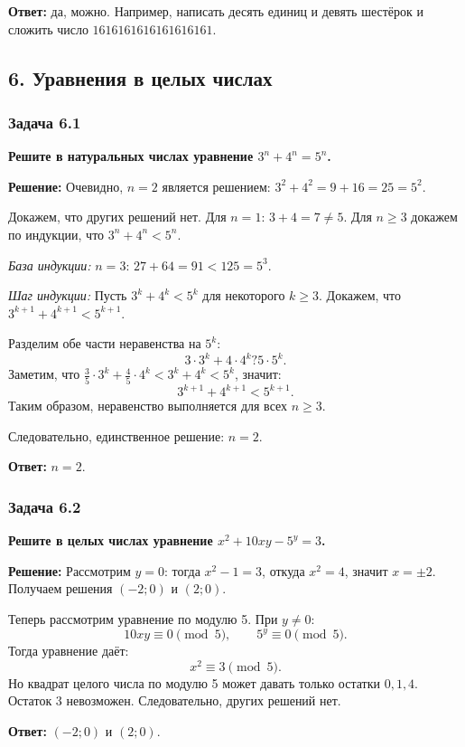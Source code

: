 \documentclass[12pt, a4paper]{article}
\begin{document}
\textbf{Ответ:} да, можно. Например, написать десять единиц и девять шестёрок и сложить число $1616161616161616161$.

\subsection*{6. Уравнения в целых числах}

\subsubsection*{Задача 6.1}
\textbf{Решите в натуральных числах уравнение $3^n + 4^n = 5^n$.}

\textbf{Решение:}
Очевидно, $n = 2$ является решением: $3^2 + 4^2 = 9 + 16 = 25 = 5^2$.

Докажем, что других решений нет. Для $n = 1$: $3 + 4 = 7 \neq 5$. Для $n \ge 3$ докажем по индукции, что $3^n + 4^n < 5^n$.

\textit{База индукции:} $n = 3$: $27 + 64 = 91 < 125 = 5^3$.

\textit{Шаг индукции:} Пусть $3^k + 4^k < 5^k$ для некоторого $k \ge 3$. Докажем, что $3^{k+1} + 4^{k+1} < 5^{k+1}$.

Разделим обе части неравенства на $5^k$:
\[
3 \cdot 3^k + 4 \cdot 4^k ? 5 \cdot 5^k.
\]
Заметим, что $\frac{3}{5} \cdot 3^k + \frac{4}{5} \cdot 4^k < 3^k + 4^k < 5^k$, значит:
\[
3^{k+1} + 4^{k+1} < 5^{k+1}.
\]
Таким образом, неравенство выполняется для всех $n \ge 3$.

Следовательно, единственное решение: $n = 2$.

\textbf{Ответ:} $n = 2$.

\subsubsection*{Задача 6.2}
\textbf{Решите в целых числах уравнение $x^2 + 10xy - 5^y = 3$.}

\textbf{Решение:}
Рассмотрим $y = 0$: тогда $x^2 - 1 = 3$, откуда $x^2 = 4$, значит $x = \pm 2$. Получаем решения $(-2; 0)$ и $(2; 0)$.

Теперь рассмотрим уравнение по модулю 5. При $y \neq 0$:
\[
10xy \equiv 0 \pmod{5}, \qquad 5^y \equiv 0 \pmod{5}.
\]
Тогда уравнение даёт:
\[
x^2 \equiv 3 \pmod{5}.
\]
Но квадрат целого числа по модулю 5 может давать только остатки $0, 1, 4$. Остаток 3 невозможен. Следовательно, других решений нет.

\textbf{Ответ:} $(-2; 0)$ и $(2; 0)$.
\end{document}
